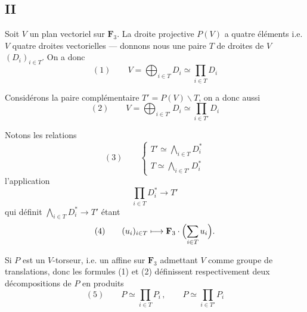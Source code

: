 \documentclass[11pt,a4paper]{article}
\begin{document}

\subsection{II}


Soit $V$ un \struck{\ill{}} plan vectoriel sur $\mathbf{F}_3$. La droite
projective $P(V)$ a quatre éléments i.e. $V$  quatre droites
vectorielles --- donnons nous une paire $T$ de droites de $V$
$(D_i)_{i \in T}$. On a donc
\[
  (1) \qquad V = \bigoplus_{i \in T} D_i \simeq \prod_{i \in T} D_i
\]

Considérons la paire complémentaire $T' = P(V) \smallsetminus T$,
\struck{\ill{}} on a donc aussi
\[
  (2) \qquad V = \bigoplus_{i \in T'} D_i \simeq \prod_{i \in T'} D_i
\]

Notons les relations
\[
  (3) \qquad
  \begin{cases}
    T' \simeq \bigwedge_{i \in T} D_i^{*} \\
    T \simeq \bigwedge_{i \in T'} D_i^{*}
  \end{cases}
\]
l'application
\[
  \prod_{i \in T} D_i^{*} \longrightarrow T'
\]
qui définit $\bigwedge_{i \in T} D_i^{*} \to T'$ étant
\[
  (4) \qquad (u_i)_{i \in T} \longmapsto \mathbf{F}_3 \cdot \Bigl(\sum_{i \in T} u_i\Bigr).
\]

Si $P$ est un $V$-torseur, i.e. un  affine sur $\mathbf{F}_3$
admettant $V$ comme groupe de translations, donc les formules (1) et (2)
définissent respectivement deux décompositions de $P$ en produits
\[
  (5) \qquad P \simeq \prod_{i \in T} P_i\, , \qquad P \simeq \prod_{i \in T'} P_i
\]

\end{document}
